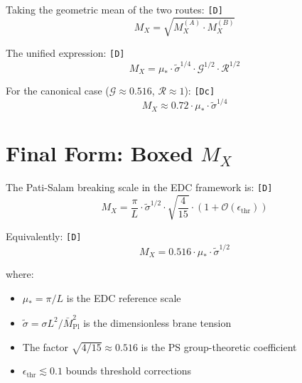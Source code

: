\documentclass[11pt,a4paper]{article}
\newcommand{\tagD}{\textcolor{green!50!black}{\texttt{[D]}}}
\newcommand{\tagDc}{\textcolor{blue!70!black}{\texttt{[Dc]}}}
\theoremstyle{definition}
\begin{document}
Taking the geometric mean of the two routes: \tagD{}
\begin{equation}
\label{eq:mx-unified}
M_X = \sqrt{M_X^{(A)} \cdot M_X^{(B)}}
\end{equation}

The unified expression: \tagD{}
\begin{equation}
\label{eq:mx-unified-explicit}
\boxed{M_X = \mu_* \cdot \tilde{\sigma}^{1/4} \cdot \mathcal{G}^{1/2} \cdot \mathcal{R}^{1/2}}
\end{equation}

For the canonical case ($\mathcal{G} \approx 0.516$, $\mathcal{R} \approx 1$): \tagDc{}
\begin{equation}
\label{eq:mx-canonical}
M_X \approx 0.72 \cdot \mu_* \cdot \tilde{\sigma}^{1/4}
\end{equation}

\section{Final Form: Boxed $M_X$}
\label{sec:final-mx}

\begin{canonbox}
The Pati-Salam breaking scale in the EDC framework is: \tagD{}
\begin{equation}
\label{eq:mx-final-boxed}
\boxed{M_X = \frac{\pi}{L} \cdot \tilde{\sigma}^{1/2} \cdot \sqrt{\frac{4}{15}} \cdot \left(1 + \mathcal{O}(\epsilon_{\text{thr}})\right)}
\end{equation}

Equivalently: \tagD{}
\begin{equation}
\label{eq:mx-final-numeric}
\boxed{M_X = 0.516 \cdot \mu_* \cdot \tilde{\sigma}^{1/2}}
\end{equation}

where:
\begin{itemize}
  \item $\mu_* = \pi/L$ is the EDC reference scale
  \item $\tilde{\sigma} = \sigma L^2 / \bar{M}_{\text{Pl}}^2$ is the dimensionless brane tension
  \item The factor $\sqrt{4/15} \approx 0.516$ is the PS group-theoretic coefficient
  \item $\epsilon_{\text{thr}} \lesssim 0.1$ bounds threshold corrections
\end{itemize}
\end{canonbox}
\end{document}
